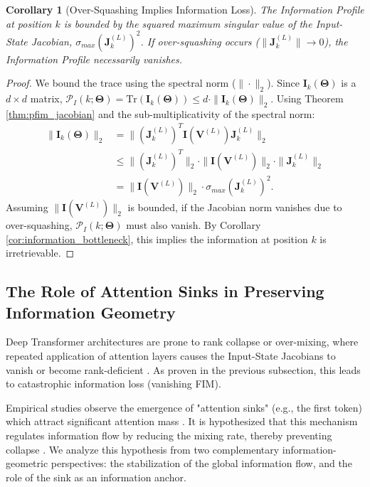 \documentclass{article}
\newtheorem{corollary}[theorem]{Corollary}
\theoremstyle{definition}
\begin{document}
\begin{corollary}[Over-Squashing Implies Information Loss]
\label{cor:oversquashing_loss}
The Information Profile at position $k$ is bounded by the squared maximum singular value of the Input-State Jacobian, $\sigma_{max}(\mathbf{J}_k^{(L)})^2$. If over-squashing occurs ($\|\mathbf{J}_k^{(L)}\| \to 0$), the Information Profile necessarily vanishes.
\end{corollary}
\begin{proof}
We bound the trace using the spectral norm ($\|\cdot\|_2$). Since $\mathbf{I}_k(\mathbf{\Theta})$ is a $d \times d$ matrix, $\mathcal{P}_I(k; \mathbf{\Theta}) = \text{Tr}(\mathbf{I}_k(\mathbf{\Theta})) \leq d \cdot \|\mathbf{I}_k(\mathbf{\Theta})\|_2$.
Using Theorem \ref{thm:pfim_jacobian} and the sub-multiplicativity of the spectral norm:
\begin{align}
    \|\mathbf{I}_k(\mathbf{\Theta})\|_2 &= \|(\mathbf{J}_k^{(L)})^T \mathbf{I}(\mathbf{V}^{(L)}) \mathbf{J}_k^{(L)}\|_2 \\
    &\leq \|(\mathbf{J}_k^{(L)})^T\|_2 \cdot \|\mathbf{I}(\mathbf{V}^{(L)})\|_2 \cdot \|\mathbf{J}_k^{(L)}\|_2 \\
    &= \|\mathbf{I}(\mathbf{V}^{(L)})\|_2 \cdot \sigma_{max}(\mathbf{J}_k^{(L)})^2.
\end{align}
Assuming $\|\mathbf{I}(\mathbf{V}^{(L)})\|_2$ is bounded, if the Jacobian norm vanishes due to over-squashing, $\mathcal{P}_I(k; \mathbf{\Theta})$ must also vanish. By Corollary \ref{cor:information_bottleneck}, this implies the information at position $k$ is irretrievable.
\end{proof}




\subsection{The Role of Attention Sinks in Preserving Information Geometry}

Deep Transformer architectures are prone to rank collapse or over-mixing, where repeated application of attention layers causes the Input-State Jacobians to vanish or become rank-deficient \cite{dong2021attention}. As proven in the previous subsection, this leads to catastrophic information loss (vanishing FIM).

Empirical studies observe the emergence of "attention sinks" (e.g., the first token) which attract significant attention mass \cite{xiao2024efficient}. It is hypothesized that this mechanism regulates information flow by reducing the mixing rate, thereby preventing collapse \cite{barbero2025sinks}. We analyze this hypothesis from two complementary information-geometric perspectives: the stabilization of the global information flow, and the role of the sink as an information anchor.
\end{document}
